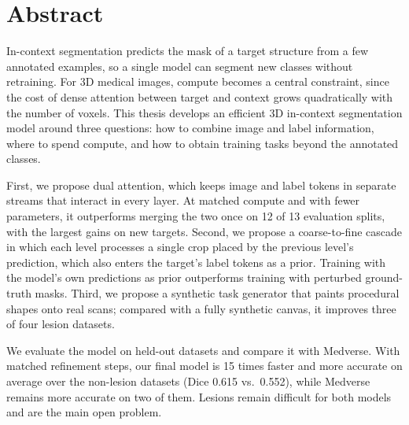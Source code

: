\section*{Abstract}

In-context segmentation predicts the mask of a target structure from a few
annotated examples, so a single model can segment new classes without
retraining. For 3D medical images, compute becomes a central constraint,
since the cost of dense attention between target and context grows
quadratically with the number of voxels. This thesis develops an efficient 3D
in-context segmentation model around three questions: how to combine image
and label information, where to spend compute, and how to obtain training
tasks beyond the annotated classes.

First, we propose dual attention, which keeps image and label tokens in
separate streams that interact in every layer. At matched compute and with
fewer parameters, it outperforms merging the two once on 12 of 13 evaluation
splits, with the largest gains on new targets. Second, we propose a
coarse-to-fine cascade in which each level processes a single crop placed by
the previous level's prediction, which also enters the target's label tokens
as a prior. Training with the model's own predictions as prior outperforms
training with perturbed ground-truth masks. Third, we propose a synthetic
task generator that paints procedural shapes onto real scans; compared with a
fully synthetic canvas, it improves three of four lesion datasets.

We evaluate the model on held-out datasets and
compare it with Medverse. With matched refinement steps, our final model is
15 times faster and more accurate on average over the non-lesion datasets
(Dice 0.615 vs.\ 0.552), while Medverse remains more accurate on two of them.
Lesions remain difficult for both models and are the main open problem.